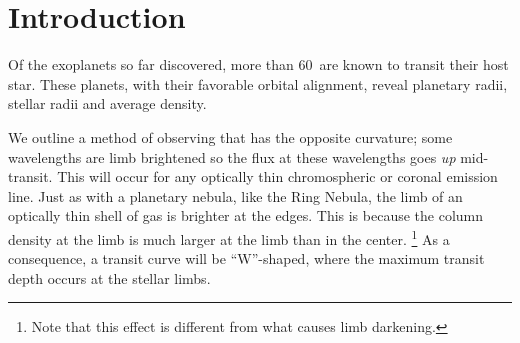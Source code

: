 \documentclass[manuscript]{aastex}
\newcommand{\numt}{60}
\begin{document}


\section{Introduction}
Of the exoplanets so far discovered, more than \numt\ are known to
transit their host star. These planets, with their favorable orbital
alignment, reveal planetary radii, stellar radii and average
density.

%

We outline a method of observing that has the opposite curvature; some
wavelengths are limb brightened so the flux at these wavelengths goes
{\it up} mid-transit. This will occur for any optically thin
chromospheric or coronal emission line. Just as with a planetary
nebula, like the Ring Nebula, the limb of an optically thin shell of
gas is brighter at the edges. This is because the column density at
the limb is much larger at the limb than in the center. \footnote{Note
that this effect is different from what causes limb darkening.} As a
consequence, a transit curve will be ``W''-shaped, where the maximum
transit depth occurs at the stellar limbs.
\end{document}
